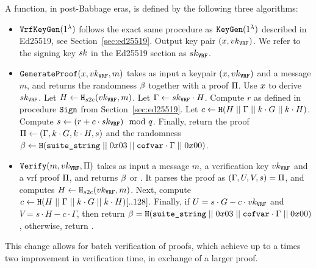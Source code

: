 A \vrf function, in post-Babbage eras, is defined by the following three algorithms:
\begin{itemize}
\item $\texttt{VrfKeyGen}(1^\lambda)$ follows the exact same procedure as $\texttt{KeyGen}(1^\lambda)$ described in Ed25519, see Section~\ref{sec:ed25519}. Output key pair $(x, vk_{\texttt{VRF}})$. We refer to the signing key $sk$ in the Ed25519 section as $sk_{\texttt{VRF}}$.
\item $\texttt{GenerateProof}(x, vk_{\texttt{VRF}}, m)$ takes as input a keypair $(x, vk_{\texttt{VRF}})$ and a message $m$, and returns the \vrf randomness $\beta$ together with a proof $\Pi$. Use $x$ to derive $sk_{\texttt{VRF}}$. Let $H \gets \texttt{H}_{s2c}(vk_{\texttt{VRF}}, m)$. Let $\Gamma \gets sk_{\texttt{VRF}}\cdot H$. Compute $r$ as defined in procedure $\texttt{Sign}$ from Section~\ref{sec:ed25519}. Let $c \gets \texttt{H}(H\;||\;\Gamma\;||\; k\cdot G\;||\; k\cdot H)$. Compute $s \gets (r + c\cdot sk_{\texttt{VRF}})\mod{q}$. Finally, return the proof $\Pi \gets (\Gamma, k\cdot G, k\cdot H, s)$ and the randomness $\beta \gets  \texttt{H}(\texttt{suite\_string}\;||\; 0x03\;||\;\texttt{cofvar}\cdot\Gamma\;||\; 0x00)$.
\item $\texttt{Verify}(m, vk_{\texttt{VRF}}, \Pi)$ takes as input a message $m$, a verification key $vk_{\texttt{VRF}}$ and a vrf proof $\Pi$, and returns $\beta$ or \false. It parses the proof as $(\Gamma, U, V, s) = \Pi$, and computes $H\gets\texttt{H}_{s2c}(vk_{\texttt{VRF}}, m)$. Next, compute $c \gets \texttt{H}(H\;||\;\Gamma\;||\; k\cdot G\;||\; k\cdot H)[..128]$. Finally, if $U = s\cdot G - c\cdot vk_{\texttt{VRF}}$ and $V = s\cdot H - c\cdot\Gamma$, then return $\beta =  \texttt{H}(\texttt{suite\_string}\;||\; 0x03\;||\;\texttt{cofvar}\cdot\Gamma\;||\; 0x00)$, otherwise, return \false.
\end{itemize}

This change allows for batch verification of proofs, which achieve up to a times two improvement in verification time, in exchange of a larger proof.
